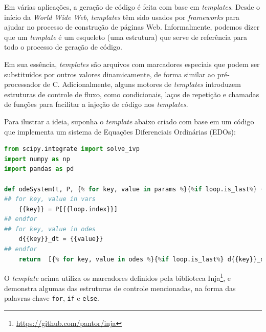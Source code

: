 \documentclass[
	12pt,				%
	openright,			%
	oneside,			%
	a4paper,			%
	main=brazil,
	english,			%
	]{ufsj-abntex2}
\begin{document}
Em várias aplicações, a geração de código é feita com base em \textit{templates}. Desde o início da \textit{World Wide Web}, \textit{templates} têm sido usados por \textit{frameworks} para ajudar no processo de construção de páginas Web. Informalmente, podemos dizer que um \textit{template} é um esqueleto (uma estrutura) que serve de referência para todo o processo de geração de código.

Em sua essência, \textit{templates} são arquivos com marcadores especiais que podem ser substituídos por outros valores dinamicamente, de forma similar ao pré-processador de C. Adicionalmente, alguns motores de \textit{templates} introduzem estruturas de controle de fluxo, como condicionais, laços de repetição e chamadas de funções para facilitar a injeção de código nos \textit{templates}.  

Para ilustrar a ideia, suponha o \textit{template} abaixo criado com base em um código que implementa um sistema de Equações Diferenciais Ordinárias (EDOs):  

\begin{lstlisting}[language=Python, firstnumber=1]
from scipy.integrate import solve_ivp
import numpy as np
import pandas as pd

def odeSystem(t, P, {% for key, value in params %}{%if loop.is_last%} {{key}} {%else%} {{key}}, {%endif%}{%endfor%}):
## for key, value in vars
    {{key}} = P[{{loop.index}}]
## endfor
## for key, value in odes
    d{{key}}_dt = {{value}}
## endfor     
    return  [{% for key, value in odes %}{%if loop.is_last%} d{{key}}_dt {%else%} d{{key}}_dt, {%endif%}{%endfor%}]
\end{lstlisting}

O \textit{template} acima utiliza os marcadores definidos pela biblioteca Inja\footnote{\href{https://github.com/pantor/inja}{https://github.com/pantor/inja}}, e demonstra algumas das estruturas de controle mencionadas, na forma das palavras-chave \texttt{\textcolor{codepurple}{for}}, \texttt{\textcolor{codepurple}{if}} e \texttt{\textcolor{codepurple}{else}}.


\end{document}
